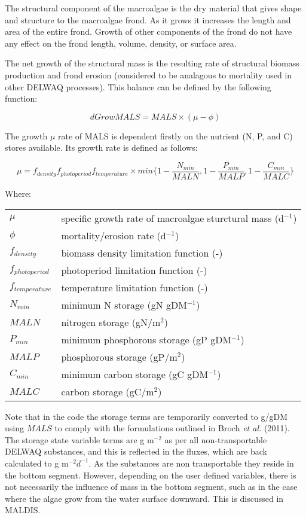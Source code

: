 \documentclass{deltares_manual}
\begin{document}
The structural component of the macroalgae is the dry material that gives shape and structure to the macroalgae frond. As it grows it increases the length and area of the entire frond. Growth of other components of the frond do not have any effect on the frond length, volume, density, or surface area. 

The net growth of the structural mass is the resulting rate of structural biomass production and frond erosion (considered to be analagous to mortality used in other DELWAQ processes). This balance can be defined by the following function:

\[dGrowMALS =MALS \times (\mu - \phi)\]

The growth $\mu$ rate of MALS is dependent firstly on the nutrient (N, P, and C) stores available. Its growth rate is defined as follows:

\[\mu = f_{density} f_{photoperiod} f_{temperature}\times min\big\{1-\frac{N_{min}}{MALN},1-\frac{P_{min}}{MALP},1-\frac{C_{min}}{MALC}\big\}\]

Where:\\
\begin{tabular}{ll}
$\mu$  & specific growth rate of macroalgae sturctural mass (d$^{-1}$) \\
$\phi$ & mortality/erosion rate (d$^{-1}$) \\
$f_{density}$ & biomass density limitation function (-)\\
$f_{photoperiod}$ & photoperiod limitation function (-)\\
$f_{temperature}$ & temperature limitation function (-)\\
$N_{min}$ & minimum N storage (gN gDM$^{-1}$)\\
$MALN$ & nitrogen storage (gN/m$^2$)\\
$P_{min}$ & minimum phosphorous storage (gP gDM$^{-1}$)\\
$MALP$ & phosphorous storage (gP/m$^2$)\\
$C_{min}$ & minimum carbon storage (gC gDM$^{-1}$)\\
$MALC$ & carbon storage (gC/m$^2$)\\
\end{tabular}

Note that in the code the storage terms are temporarily converted to g/gDM using $MALS$ to comply with the formulations outlined in Broch \textit{et al.} (2011). The storage state variable terms are g m$^{-2}$ as per all non-transportable DELWAQ substances, and this is reflected in the fluxes, which are back calculated to g m$^{-2}d^{-1}$. As the substances are non transportable they reside in the bottom segment. However, depending on the user defined variables, there is not necessarily the influence of mass in the bottom segment, such as in the case where the algae grow from the water surface downward. This is discussed in MALDIS.
\end{document}
